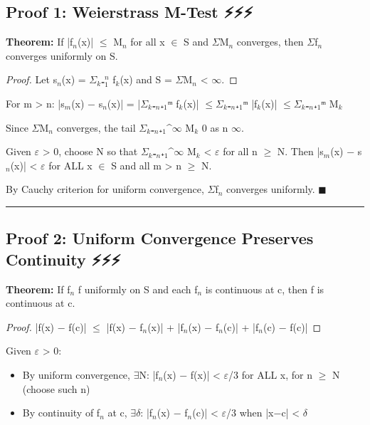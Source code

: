 \documentclass[12pt,a4paper,openany]{book}
\begin{document}
{{\subsection{Proof 1: Weierstrass M-Test ⚡⚡⚡}

\begin{tcolorbox}[colback=lightblue,colframe=thmblue,title=\textbf{Theorem},breakable,boxrule=1.5pt]
\textbf{Theorem:} If |f$_n$(x)| $\leq$ M$_n$ for all x $\in$ S and $\Sigma$M$_n$ converges, then $\Sigma$f$_n$ converges uniformly on S.
\end{tcolorbox}

\begin{proof}

Let s$_n$(x) = $\Sigma_k$₌$_1^n$ f$_k$(x) and S = $\Sigma$M$_n$ < $\infty$.
\end{proof}

For m > n: |s$_m$(x) − s$_n$(x)| = |$\Sigma_k$₌$_n$₊$_1$ᵐ f$_k$(x)| $\leq\Sigma_k$₌$_n$₊$_1$ᵐ |f$_k$(x)| $\leq\Sigma_k$₌$_n$₊$_1$ᵐ M$_k$

Since $\Sigma$M$_n$ converges, the tail $\Sigma_k$₌$_n$₊$_1$^$\infty$ M$_k$  0 as n  $\infty$.

Given $\varepsilon$ > 0, choose N so that $\Sigma_k$₌$_n$₊$_1$^$\infty$ M$_k$ < $\varepsilon$ for all n $\geq$ N.
Then |s$_m$(x) − s$_n$(x)| < $\varepsilon$ for ALL x $\in$ S and all m > n $\geq$ N.

By Cauchy criterion for uniform convergence, $\Sigma$f$_n$ converges uniformly. $\blacksquare$

\bigskip\noindent\rule{\textwidth}{0.4pt}\bigskip

\subsection{Proof 2: Uniform Convergence Preserves Continuity ⚡⚡⚡}

\begin{tcolorbox}[colback=lightblue,colframe=thmblue,title=\textbf{Theorem},breakable,boxrule=1.5pt]
\textbf{Theorem:} If f$_n$  f uniformly on S and each f$_n$ is continuous at c, then f is continuous at c.
\end{tcolorbox}

\begin{proof}

|f(x) − f(c)| $\leq$ |f(x) − f$_n$(x)| + |f$_n$(x) − f$_n$(c)| + |f$_n$(c) − f(c)|
\end{proof}

Given $\varepsilon$ > 0:
\begin{itemize}[leftmargin=*]
  \item By uniform convergence, $\exists$N: |f$_n$(x) − f(x)| < $\varepsilon$/3 for ALL x, for n $\geq$ N (choose such n)
  \item By continuity of f$_n$ at c, $\exists\delta$: |f$_n$(x) − f$_n$(c)| < $\varepsilon$/3 when |x−c| < $\delta$
\end{itemize}

}}
\end{document}
